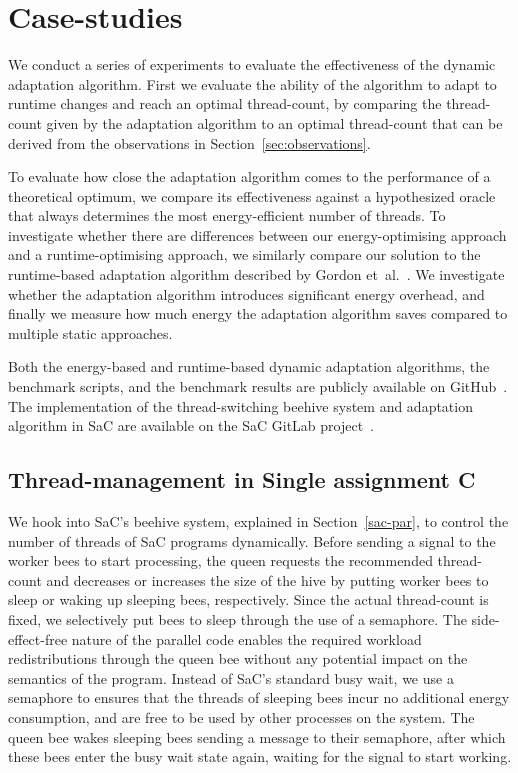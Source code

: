 \section{Case-studies}\label{sec:evalation}
We conduct a series of experiments to evaluate the effectiveness of the dynamic adaptation
algorithm. First we evaluate the ability of the algorithm to adapt to runtime changes and reach an
optimal thread-count, by comparing the thread-count given by the adaptation algorithm to an optimal
thread-count that can be derived from the observations in Section~\ref{sec:observations}.

To evaluate how close the adaptation algorithm comes to the performance of a theoretical optimum, we
compare its effectiveness against a hypothesized oracle that always determines the most
energy-efficient number of threads. To investigate whether there are differences between our
energy-optimising approach and a runtime-optimising approach, we similarly compare our solution to
the runtime-based adaptation algorithm described by Gordon et~al.~\cite{sac-mtdynamic}. We
investigate whether the adaptation algorithm introduces significant energy overhead, and finally we
measure how much energy the adaptation algorithm saves compared to multiple static approaches.

Both the energy-based and runtime-based dynamic adaptation algorithms, the benchmark scripts, and
the benchmark results are publicly available on GitHub~\cite{repo-mt}. The implementation of the
thread-switching beehive system and adaptation algorithm in SaC are available on the SaC
GitLab project~\cite{repo-sac}.

\subsection{Thread-management in Single assignment C}\label{sec:implementation-sac}
We hook into SaC's beehive system, explained in Section~\ref{sac-par}, to control the number of
threads of SaC programs dynamically. Before sending a signal to the worker bees to start
processing, the queen requests the recommended thread-count and decreases or increases the size of
the hive by putting worker bees to sleep or waking up sleeping bees, respectively. Since the actual
thread-count is fixed, we selectively put bees to sleep through the use of a semaphore. The
side-effect-free nature of the parallel code enables the required workload redistributions through
the queen bee without any potential impact on the semantics of the program. Instead of SaC's
standard busy wait, we use a semaphore to ensures that the threads of sleeping bees incur no
additional energy consumption, and are free to be used by other processes on the system. The queen
bee wakes sleeping bees sending a message to their semaphore, after which these bees enter the busy
wait state again, waiting for the signal to start working.


